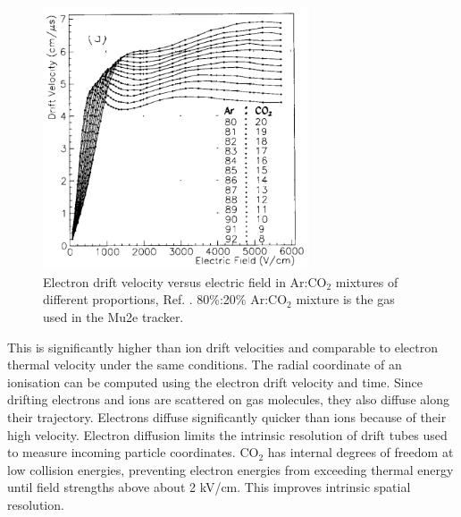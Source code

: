 \begin{figure}[!h]
    \centering
    \includegraphics[width =0.7\textwidth]{figures/png/Screenshot_20240330_102206.png}
    \caption[Electron drift velocity versus electric field in Ar:CO$_2$ mixtures.]{Electron drift velocity versus electric field in Ar:CO$_2$ mixtures of different proportions, Ref. \cite{ZHAO1994485}. 
    80\%:20\% Ar:CO$_2$ mixture is the gas used in the Mu2e tracker.}
    \label{fig:drift}
\end{figure}

This is significantly higher than ion drift velocities and comparable to electron
thermal velocity under the same conditions. 
The radial coordinate of an ionisation can be computed using the electron drift velocity and time.
Since drifting electrons and ions are scattered on gas molecules, they also diffuse along their trajectory. 
Electrons diffuse significantly quicker than ions because of their high velocity. Electron diffusion limits 
the intrinsic resolution of drift tubes used to measure incoming particle coordinates. CO$_2$ has internal 
degrees of freedom at low collision energies, preventing electron energies from exceeding thermal energy until 
field strengths above about 2 kV/cm. This improves intrinsic spatial resolution.
